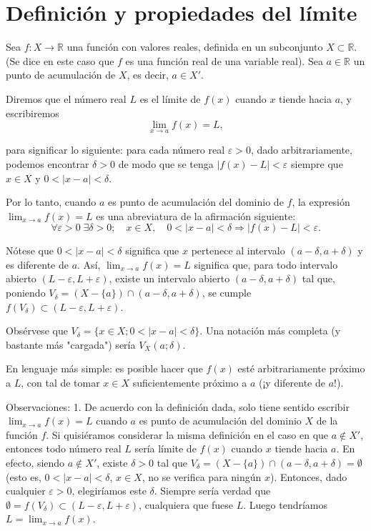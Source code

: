 \documentclass[12pt,oneside]{book}
\begin{document}
\section{Definición y propiedades del límite}

Sea \( f: X \to \mathbb{R} \) una función con valores reales, definida en un subconjunto \( X \subset \mathbb{R} \). (Se dice en este caso que \( f \) es una función real de una variable real). Sea \( a \in \mathbb{R} \) un punto de acumulación de \( X \), es decir, \( a \in X' \).

Diremos que el número real \( L \) es el límite de \( f(x) \) cuando \( x \) tiende hacia \( a \), y escribiremos
\[\lim_{x \to a} f(x) = L,\]

para significar lo siguiente: para cada número real \( \varepsilon > 0 \), dado arbitrariamente, podemos encontrar \( \delta > 0 \) de modo que se tenga \( |f(x) - L| < \varepsilon \) siempre que \( x \in X \) y \( 0 < |x - a| < \delta \).

Por lo tanto, cuando \( a \) es punto de acumulación del dominio de \( f \), la expresión \( \lim_{x \to a} f(x) = L \) es una abreviatura de la afirmación siguiente:
\[\forall \varepsilon > 0 \; \exists \delta > 0; \quad x \in X, \quad 0 < |x - a| < \delta \Rightarrow |f(x) - L| < \varepsilon.\]

Nótese que \( 0 < |x - a| < \delta \) significa que \( x \) pertenece al intervalo \( (a - \delta, a + \delta) \) y es diferente de \( a \). Así, \( \lim_{x \to a} f(x) = L \) significa que, para todo intervalo abierto \( (L - \varepsilon, L + \varepsilon) \), existe un intervalo abierto \( (a - \delta, a + \delta) \) tal que, poniendo \( V_{\delta} = (X - \{a\}) \cap (a - \delta, a + \delta) \), se cumple \( f(V_{\delta}) \subset (L - \varepsilon, L + \varepsilon) \).

Obsérvese que \( V_{\delta} = \{x \in X; 0 < |x - a| < \delta\} \). Una notación más completa (y bastante más "cargada") sería \( V_X(a; \delta) \).

En lenguaje más simple: es posible hacer que \( f(x) \) esté arbitrariamente próximo a \( L \), con tal de tomar \( x \in X \) suficientemente próximo a \( a \) (¡y diferente de \( a \)!).

Observaciones: 1. De acuerdo con la definición dada, solo tiene sentido escribir \( \lim_{x \to a} f(x) = L \) cuando \( a \) es punto de acumulación del dominio \( X \) de la función \( f \). Si quisiéramos considerar la misma definición en el caso en que \( a \notin X' \), entonces todo número real \( L \) sería límite de \( f(x) \) cuando \( x \) tiende hacia \( a \). En efecto, siendo \( a \notin X' \), existe \( \delta > 0 \) tal que \( V_{\delta} = (X - \{a\}) \cap (a - \delta, a + \delta) = \emptyset \) (esto es, \( 0 < |x - a| < \delta \), \( x \in X \), no se verifica para ningún \( x \)). Entonces, dado cualquier \( \varepsilon > 0 \), elegiríamos este \( \delta \). Siempre sería verdad que \( \emptyset = f(V_{\delta}) \subset (L - \varepsilon, L + \varepsilon) \), cualquiera que fuese \( L \). Luego tendríamos \( L = \lim_{x \to a} f(x) \).
\end{document}
